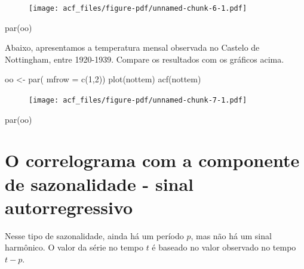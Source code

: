 \documentclass[
  letterpaper,
  DIV=11,
  numbers=noendperiod]{scrreprt}
\newenvironment{Shaded}{\begin{snugshade}}{\end{snugshade}}
\newcommand{\AttributeTok}[1]{\textcolor[rgb]{0.40,0.45,0.13}{#1}}
\newcommand{\DecValTok}[1]{\textcolor[rgb]{0.68,0.00,0.00}{#1}}
\newcommand{\FunctionTok}[1]{\textcolor[rgb]{0.28,0.35,0.67}{#1}}
\newcommand{\NormalTok}[1]{\textcolor[rgb]{0.00,0.23,0.31}{#1}}
\newcommand{\OtherTok}[1]{\textcolor[rgb]{0.00,0.23,0.31}{#1}}
\begin{document}
\begin{figure}[H]

{\centering \texttt{[image: acf\_files/figure-pdf/unnamed-chunk-6-1.pdf]}

}

\end{figure}

\begin{Shaded}
\begin{Highlighting}[]
\FunctionTok{par}\NormalTok{(oo)}
\end{Highlighting}
\end{Shaded}

Abaixo, apresentamos a temperatura mensal observada no Castelo de
Nottingham, entre 1920-1939. Compare os resultados com os gráficos
acima.

\begin{Shaded}
\begin{Highlighting}[]
\NormalTok{oo }\OtherTok{\textless{}{-}} \FunctionTok{par}\NormalTok{( }\AttributeTok{mfrow =} \FunctionTok{c}\NormalTok{(}\DecValTok{1}\NormalTok{,}\DecValTok{2}\NormalTok{))}
  \FunctionTok{plot}\NormalTok{(nottem)}
  \FunctionTok{acf}\NormalTok{(nottem)}
\end{Highlighting}
\end{Shaded}

\begin{figure}[H]

{\centering \texttt{[image: acf\_files/figure-pdf/unnamed-chunk-7-1.pdf]}

}

\end{figure}

\begin{Shaded}
\begin{Highlighting}[]
\FunctionTok{par}\NormalTok{(oo)  }
\end{Highlighting}
\end{Shaded}

\hypertarget{o-correlograma-com-a-componente-de-sazonalidade---sinal-autorregressivo}{%
\section{O correlograma com a componente de sazonalidade - sinal
autorregressivo}\label{o-correlograma-com-a-componente-de-sazonalidade---sinal-autorregressivo}}

Nesse tipo de sazonalidade, ainda há um período \(p\), mas não há um
sinal harmônico. O valor da série no tempo \(t\) é baseado no valor
observado no tempo \(t-p\).
\end{document}
